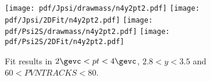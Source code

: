 \begin{figure}[H]
\begin{center}
\texttt{[image: pdf/Jpsi/drawmass/n4y2pt2.pdf]}
\texttt{[image: pdf/Jpsi/2DFit/n4y2pt2.pdf]}
\vspace*{-0.5cm}
\texttt{[image: pdf/Psi2S/drawmass/n4y2pt2.pdf]}
\texttt{[image: pdf/Psi2S/2DFit/n4y2pt2.pdf]}
\vspace*{-0.5cm}
\end{center}
\caption{Fit results in $2\gevc<pt<4\gevc$, $2.8<y<3.5$ and $60<PVNTRACKS<80$.}
\label{Fitn4y2pt2}
\end{figure}
